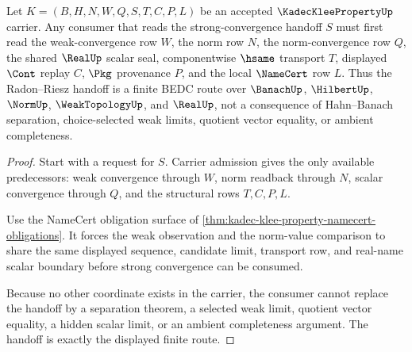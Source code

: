 \begin{theorem}
\label{thm:kadec-klee-property-weak-strong-handoff}
Let $K=(B,H,N,W,Q,S,T,C,P,L)$ be an accepted $\KadecKleePropertyUp$ carrier. Any consumer that reads the strong-convergence handoff $S$ must first read the weak-convergence row $W$, the norm row $N$, the norm-convergence row $Q$, the shared $\RealUp$ scalar seal, componentwise $\hsame$ transport $T$, displayed $\Cont$ replay $C$, $\Pkg$ provenance $P$, and the local $\NameCert$ row $L$. Thus the Radon--Riesz handoff is a finite BEDC route over $\BanachUp$, $\HilbertUp$, $\NormUp$, $\WeakTopologyUp$, and $\RealUp$, not a consequence of Hahn--Banach separation, choice-selected weak limits, quotient vector equality, or ambient completeness.
\end{theorem}
\begin{proof}
Start with a request for $S$. Carrier admission gives the only available predecessors: weak convergence through $W$, norm readback through $N$, scalar convergence through $Q$, and the structural rows $T,C,P,L$.

Use the NameCert obligation surface of \autoref{thm:kadec-klee-property-namecert-obligations}. It forces the weak observation and the norm-value comparison to share the same displayed sequence, candidate limit, transport row, and real-name scalar boundary before strong convergence can be consumed.

Because no other coordinate exists in the carrier, the consumer cannot replace the handoff by a separation theorem, a selected weak limit, quotient vector equality, a hidden scalar limit, or an ambient completeness argument. The handoff is exactly the displayed finite route.
\end{proof}


\begin{closurestatus}{\KadecKleePropertyUp}
  \theoryclosure{\seedClosure}
  \formalstatus{\unformalizedV}
\end{closurestatus}
